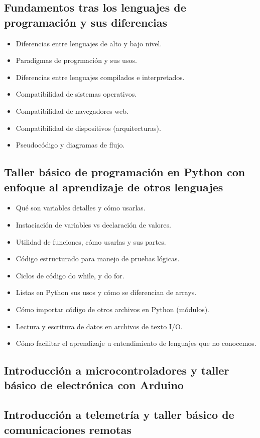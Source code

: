 ﻿\documentclass[letterpaper]{article}
\begin{document}
\subsection{Fundamentos tras los lenguajes de programación y sus diferencias}
\begin{itemize}
    \item Diferencias entre lenguajes de alto y bajo nivel.
    \item Paradigmas de progrmación y sus usos.
    \item Diferencias entre lenguajes compilados e interpretados.
    \item Compatibilidad de sistemas operativos.
    \item Compatibilidad de navegadores web.
    \item Compatibilidad de dispositivos (arquitecturas).
    \item Pseudocódigo y diagramas de flujo.
\end{itemize}
\subsection{Taller básico de programación en Python con enfoque al aprendizaje de otros lenguajes}
\begin{itemize}
    \item Qué son variables detalles y cómo usarlas.
    \item Instaciación de variables vs declaración de valores.
    \item Utilidad de funciones, cómo usarlas y sus partes.
    \item Código estructurado para manejo de pruebas lógicas.
    \item Ciclos de código do while, y do for.
    \item Listas en Python sus usos y cómo se diferencian de arrays.
    \item Cómo importar código de otros archivos en Python (módulos).
    \item Lectura y escritura de datos en archivos de texto I/O.
    \item Cómo facilitar el aprendizaje u entendimiento de lenguajes que no conocemos.
\end{itemize}
\subsection{Introducción a microcontroladores y taller básico de electrónica con Arduino}
\subsection{Introducción a telemetría y taller básico de comunicaciones remotas}
\end{document}
